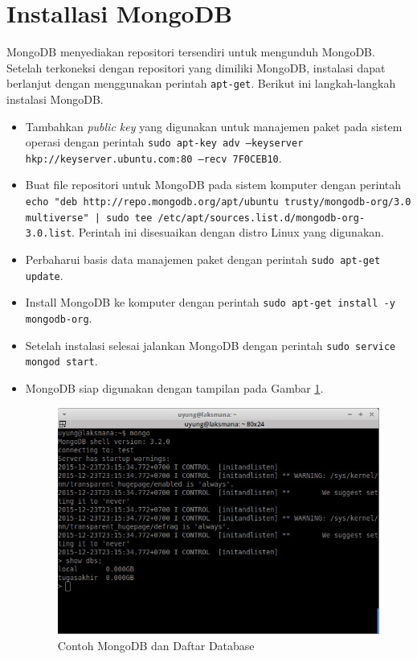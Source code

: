 \documentclass{ta-its}
\begin{document}
		\section{Installasi MongoDB}
			MongoDB menyediakan repositori tersendiri untuk mengunduh MongoDB. Setelah terkoneksi dengan repositori yang dimiliki MongoDB, instalasi dapat berlanjut dengan menggunakan perintah \texttt{apt-get}. Berikut ini langkah-langkah instalasi MongoDB.
			
			\begin{itemize}
				\item Tambahkan \textit{public key} yang digunakan untuk manajemen paket pada sistem operasi dengan perintah \texttt{sudo apt-key adv --keyserver hkp://keyserver.ubuntu.com:80 --recv 7F0CEB10}.
				\item Buat file repositori untuk MongoDB pada sistem komputer dengan perintah \texttt{echo "deb http://repo.mongodb.org/apt/ubuntu trusty/mongodb-org/3.0 multiverse" | sudo tee /etc/apt/sources.list.d/mongodb-org-3.0.list}. Perintah ini disesuaikan dengan distro Linux yang digunakan.
				\item Perbaharui basis data manajemen paket dengan perintah \texttt{sudo apt-get update}.
				\item Install MongoDB ke komputer dengan perintah \texttt{sudo apt-get install -y mongodb-org}.
				\item Setelah instalasi selesai jalankan MongoDB dengan perintah \texttt{sudo service mongod start}.
				\item MongoDB siap digunakan dengan tampilan pada Gambar \ref{gambarCekMongoDB}.
				\begin{figure}[h] %
					\centering
					\includegraphics[width=\linewidth]{contoh_img/cekmongodb}
					\caption{Contoh MongoDB dan Daftar Database}
					\label{gambarCekMongoDB}
				\end{figure}
				
			\end{itemize}
	
\end{document}
